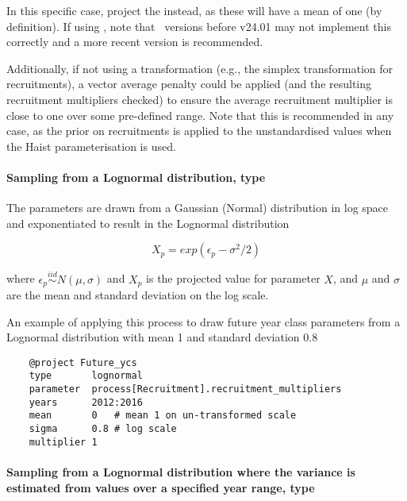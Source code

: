 In this specific case, project the  instead, as these will have a mean of one (by definition). If using , note that \CNAME\ versions before v24.01 may not implement this correctly and a more recent version is recommended. 

Additionally, if not using a transformation (e.g., the simplex transformation for recruitments), a vector average penalty could be applied (and the resulting recruitment multipliers checked) to ensure the average recruitment multiplier is close to one over some pre-defined range. Note that this is recommended in any case, as the prior on recruitments is applied to the unstandardised values when the Haist parameterisation is used. 

\paragraph[Lognormal]{Sampling from a Lognormal distribution, type  }\label{sec:Project-LogNormal} 

The parameters are drawn from a Gaussian (Normal) distribution in log space and exponentiated  to result in the Lognormal distribution

\begin{equation}\label{eq:lognormal}
X_p = exp(\epsilon_p - \sigma^2 / 2)
\end{equation}

where $\epsilon_p\stackrel{iid}{\sim}N(\mu,\sigma)$ and $X_p$ is the projected value for parameter $X$, and $\mu$ and $\sigma$ are the mean and standard deviation on the log scale.

An example of applying this process to draw future year class parameters from a Lognormal distribution with mean 1 and standard deviation 0.8

{\small{\begin{verbatim}
	@project Future_ycs
	type       lognormal
	parameter  process[Recruitment].recruitment_multipliers
	years      2012:2016
	mean       0   # mean 1 on un-transformed scale
	sigma      0.8 # log scale
	multiplier 1
\end{verbatim}}}

\paragraph[Lognormal-Empirical]{Sampling from a Lognormal distribution where the  variance is estimated from values over a specified year range, type   }\label{sec:Project-LogNormalEmpirical} 

